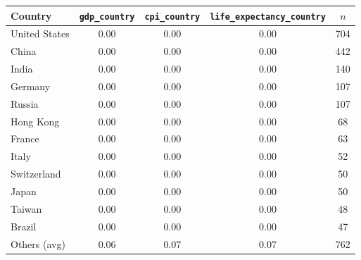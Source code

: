 \begin{tabular}{lcccc}
\toprule
Country & \texttt{gdp\_country} & \texttt{cpi\_country} & \texttt{life\_expectancy\_country} & $n$ \\
\midrule
United States & 0.00 & 0.00 & 0.00 & 704 \\
China & 0.00 & 0.00 & 0.00 & 442 \\
India & 0.00 & 0.00 & 0.00 & 140 \\
Germany & 0.00 & 0.00 & 0.00 & 107 \\
Russia & 0.00 & 0.00 & 0.00 & 107 \\
Hong Kong & 0.00 & 0.00 & 0.00 & 68 \\
France & 0.00 & 0.00 & 0.00 & 63 \\
Italy & 0.00 & 0.00 & 0.00 & 52 \\
Switzerland & 0.00 & 0.00 & 0.00 & 50 \\
Japan & 0.00 & 0.00 & 0.00 & 50 \\
Taiwan & 0.00 & 0.00 & 0.00 & 48 \\
Brazil & 0.00 & 0.00 & 0.00 & 47 \\
\midrule
Others (avg) & 0.06 & 0.07 & 0.07 & 762 \\
\bottomrule
\end{tabular}